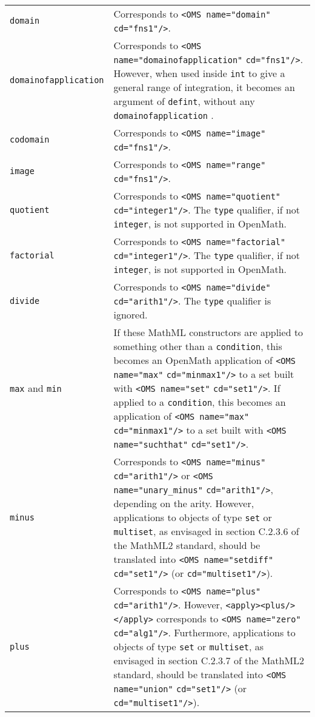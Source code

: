 \documentclass[twoside,11pt]{article}
\begin{document}
\begin{longtable}{
        >{\raggedright\let\\=\tabularnewline}p{2in}
        >{\raggedright\let\\=\tabularnewline}p{3in}}
\verb+domain+&Corresponds to \verb+<OMS name="domain"+ \verb+cd="fns1"/>+.\\
\verb+domainofapplication+&Corresponds to 
\verb+<OMS name="domainofapplication"+ \verb+cd="fns1"/>+. However,
when used inside \verb+int+ to give a general range of integration, it
becomes an argument of \verb+defint+, without any \verb+domainofapplication+
.\\
\verb+codomain+&Corresponds to \verb+<OMS name="image"+ \verb+cd="fns1"/>+.\\
\verb+image+&Corresponds to \verb+<OMS name="range"+ \verb+cd="fns1"/>+.\\
\verb+quotient+&Corresponds to \verb+<OMS name="quotient"+ 
\verb+cd="integer1"/>+. The \verb+type+ qualifier, if not \verb+integer+, is 
not supported in OpenMath.\\
\verb+factorial+&Corresponds to \verb+<OMS name="factorial"+
\verb+cd="integer1"/>+. The \verb+type+ qualifier, if not \verb+integer+, 
is not supported in OpenMath.\\
\verb+divide+&Corresponds to \verb+<OMS name="divide"+
\verb+cd="arith1"/>+. The \verb+type+ qualifier is ignored.\\
\verb+max+ and \verb+min+&If these MathML constructors are applied to
something other than a \verb+condition+, this
becomes an OpenMath application of \verb+<OMS name="max"+ \verb+cd="minmax1"/>+
to a set built with \verb+<OMS name="set"+ \verb+cd="set1"/>+. 
If applied to a \verb+condition+, this becomes an
application of \verb+<OMS name="max"+ \verb+cd="minmax1"/>+ 
to a set built with \verb+<OMS name="suchthat"+ \verb+cd="set1"/>+.\\
\verb+minus+&Corresponds to \verb+<OMS name="minus"+ \verb+cd="arith1"/>+ or
\verb+<OMS name="unary_minus"+ \verb+cd="arith1"/>+, depending on the
arity. However, applications to objects of type \verb+set+ or
\verb+multiset+, as envisaged in section C.2.3.6 of the MathML2
standard, should be translated into \verb+<OMS name="setdiff"+
\verb+cd="set1"/>+ (or \verb+cd="multiset1"/>+).\\
\verb+plus+&Corresponds to \verb+<OMS name="plus"+ \verb+cd="arith1"/>+. 
However, \verb+<apply><plus/></apply>+ corresponds to
\verb+<OMS name="zero"+ \verb+cd="alg1"/>+. Furthermore, applications to 
objects of type \verb+set+ or \verb+multiset+, as envisaged in section C.2.3.7
of the MathML2 standard, should be translated into \verb+<OMS name="union"+
\verb+cd="set1"/>+ (or \verb+cd="multiset1"/>+).\\

\end{longtable}
\end{document}
